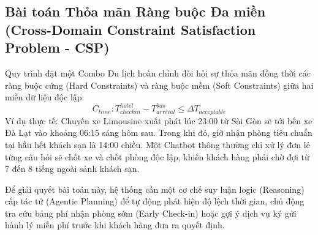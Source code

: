 \subsection{Bài toán Thỏa mãn Ràng buộc Đa miền (Cross-Domain Constraint Satisfaction Problem - CSP)}
Quy trình đặt một Combo Du lịch hoàn chỉnh đòi hỏi sự thỏa mãn đồng thời các ràng buộc cứng (Hard Constraints) và ràng buộc mềm (Soft Constraints) giữa hai miền dữ liệu độc lập:
\begin{equation}
    C_{time}: T_{checkin}^{hotel} - T_{arrival}^{bus} \le \Delta T_{acceptable}
\end{equation}
Ví dụ thực tế: Chuyến xe Limousine xuất phát lúc 23:00 từ Sài Gòn sẽ tới bến xe Đà Lạt vào khoảng 06:15 sáng hôm sau. Trong khi đó, giờ nhận phòng tiêu chuẩn tại hầu hết khách sạn là 14:00 chiều. Một Chatbot thông thường chỉ xử lý đơn lẻ từng câu hỏi sẽ chốt xe và chốt phòng độc lập, khiến khách hàng phải chờ đợi từ 7 đến 8 tiếng ngoài sảnh khách sạn. 

Để giải quyết bài toán này, hệ thống cần một cơ chế suy luận logic (Reasoning) cấp tác tử (Agentic Planning) để tự động phát hiện độ lệch thời gian, chủ động tra cứu bảng phí nhận phòng sớm (Early Check-in) hoặc gợi ý dịch vụ ký gửi hành lý miễn phí trước khi khách hàng đưa ra quyết định.
